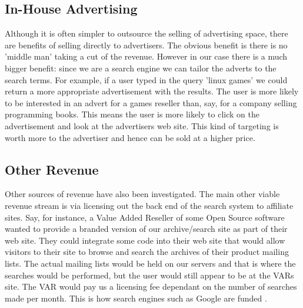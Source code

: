 \subsection{In-House Advertising}
Although it is often simpler to outsource the selling of advertising space, there are benefits of selling directly to advertisers.  The obvious benefit is there is no 'middle man' taking a cut of the revenue.  However in our case there is a much bigger benefit: since we are a search engine we can tailor the adverts to the search terms.  For example, if a user typed in the query 'linux games' we could return a more appropriate advertisement with the results.  The user is more likely to be interested in an advert for a games reseller than, say, for a company selling programming books.  This means the user is more likely to click on the advertisement and look at the advertisers web site.  This kind of targeting is worth more to the advertiser and hence can be sold at a higher price.

\subsection{Other Revenue}
Other sources of revenue have also been investigated.  The main other viable revenue stream is via licensing out the back end of the search system to affiliate sites.  Say, for instance, a Value Added Reseller of some Open Source software wanted to provide a branded version of our archive/search site as part of their web site.  They could integrate some code into their web site that would allow visitors to their site to browse and search the archives of their product mailing lists.  The actual mailing lists would be held on our servers and that is where the searches would be performed, but the user would still appear to be at the VARs site.  The VAR would pay us a licensing fee dependant on the number of searches made per month.  This is how search engines such as Google are funded \cite{www:googprog}.


